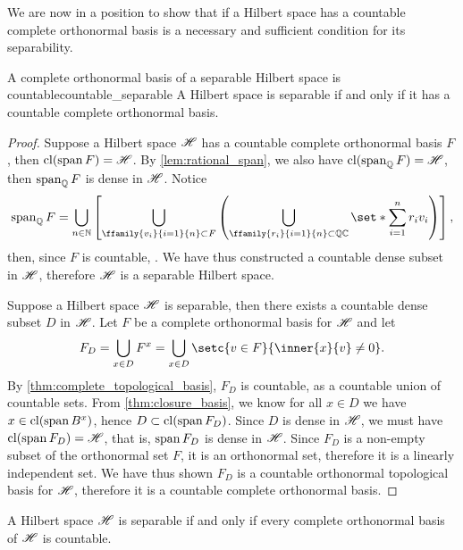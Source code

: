 We are now in a position to show that if a Hilbert space has a countable complete orthonormal basis is a necessary and sufficient condition for its separability.
\begin{theorem}{A complete orthonormal basis of a separable Hilbert space is countable}{countable_separable}
    A Hilbert space is separable if and only if it has a countable complete orthonormal basis.
\end{theorem}
\begin{proof}
    Suppose a Hilbert space \(\mathscr{H}\) has a countable complete orthonormal basis \(F\), then \(\operatorname{cl}(\operatorname{span} F) = \mathscr{H}\). By \cref{lem:rational_span}, we also have \(\operatorname{cl}(\operatorname{span}_\mathbb{Q} F) = \mathscr{H}\), then \(\operatorname{span}_\mathbb{Q} F\) is dense in \(\mathscr{H}\). Notice
    \begin{equation*}
        \lspan_\mathbb{Q} F = \bigcup_{n\in \mathbb{N}} \left[\bigcup_{\ffamily{v_i}{i=1}{n} \subset F} \left(\bigcup_{\ffamily{r_i}{i=1}{n} \subset \mathbb{Q}\mathbb{C}} \set*{\sum_{i=1}^n r_i v_i}\right)\right],
    \end{equation*}
    then, since \(F\) is countable, . We have thus constructed a countable dense subset in \(\mathscr{H}\), therefore \(\mathscr{H}\) is a separable Hilbert space.

    Suppose a Hilbert space \(\mathscr{H}\) is separable, then there exists a countable dense subset \(D\) in \(\mathscr{H}\). Let \(F\) be a complete orthonormal basis for \(\mathscr{H}\) and let
    \begin{equation*}
        F_D = \bigcup_{x \in D} F^x = \bigcup_{x \in D} \setc{v \in F}{\inner{x}{v} \neq 0}.
    \end{equation*}
    By \cref{thm:complete_topological_basis}, \(F_D\) is countable, as a countable union of countable sets. From \cref{thm:closure_basis}, we know for all \(x \in D\) we have \(x \in \operatorname{cl}(\operatorname{span} B^x)\), hence \(D \subset \operatorname{cl}(\operatorname{span} F_D)\). Since \(D\) is dense in \(\mathscr{H}\), we must have \(\operatorname{cl}(\operatorname{span} F_D) = \mathscr{H}\), that is, \(\operatorname{span} F_D\) is dense in \(\mathscr{H}\). Since \(F_D\) is a non-empty subset of the orthonormal set \(F\), it is an orthonormal set, therefore it is a linearly independent set. We have thus shown \(F_D\) is a countable orthonormal topological basis for \(\mathscr{H}\), therefore it is a countable complete orthonormal basis.
\end{proof}
\begin{corollary}
    A Hilbert space \(\mathscr{H}\) is separable if and only if every complete orthonormal basis of \(\mathscr{H}\) is countable.
\end{corollary}
